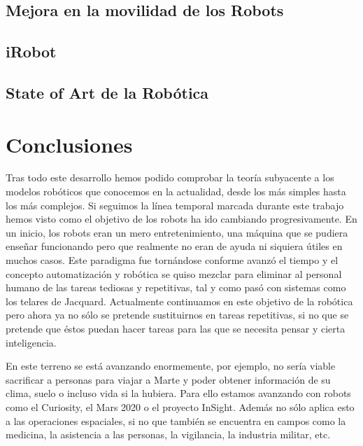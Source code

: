 \documentclass[a4paper,11pt]{article}
\begin{document}
\subsection{Mejora en la movilidad de los Robots}


\subsection{iRobot}


\subsection{State of Art de la Robótica}


\newpage
\section{Conclusiones}
Tras todo este desarrollo hemos podido comprobar la teoría subyacente a los modelos robóticos que conocemos en la actualidad, desde los más simples hasta los más complejos. Si seguimos la línea temporal marcada durante este trabajo hemos visto como el objetivo de los robots ha ido cambiando progresivamente. En un inicio, los robots eran un mero entretenimiento, una máquina que se pudiera enseñar funcionando pero que realmente no eran de ayuda ni siquiera útiles en muchos casos. Este paradigma fue tornándose conforme avanzó el tiempo y el concepto automatización y robótica se quiso mezclar para eliminar al personal humano de las tareas tediosas y repetitivas, tal y como pasó con sistemas como los telares de Jacquard. Actualmente continuamos en este objetivo de la robótica pero ahora ya no sólo se pretende sustituirnos en tareas repetitivas, si no que se pretende que éstos puedan hacer tareas para las que se necesita pensar y cierta inteligencia.

\vspace{10px}

En este terreno se está avanzando enormemente, por ejemplo, no sería viable sacrificar a personas para viajar a Marte y poder obtener información de su clima, suelo o incluso vida si la hubiera. Para ello estamos avanzando con robots como el Curiosity, el Mars 2020 o el proyecto InSight. Además no sólo aplica esto a las operaciones espaciales, si no que también se encuentra en campos como la medicina, la asistencia a las personas, la vigilancia, la industria militar, etc. 
\end{document}
